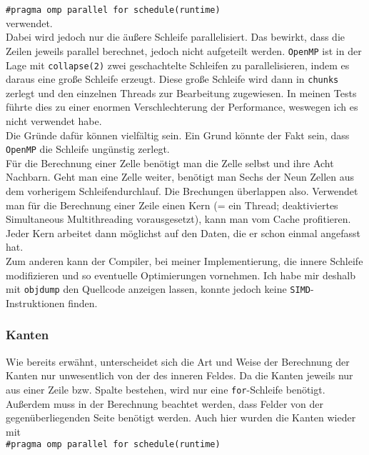 \documentclass[german,plainarticle,hyperref,utf8]{zihpub}
\begin{document}
	\texttt{\#pragma omp parallel for schedule(runtime)}\\
	
	verwendet.\\
	Dabei wird jedoch nur die äußere Schleife parallelisiert. Das bewirkt, dass die Zeilen jeweils parallel berechnet, jedoch nicht aufgeteilt werden. \texttt{OpenMP} ist in der Lage mit \texttt{collapse(2)} zwei geschachtelte Schleifen zu parallelisieren, indem es daraus eine große Schleife erzeugt. Diese große Schleife wird dann in \texttt{chunks} zerlegt und den einzelnen Threads zur Bearbeitung zugewiesen. In meinen Tests führte dies zu einer enormen Verschlechterung der Performance, weswegen ich es nicht verwendet habe.\\
	
	Die Gründe dafür können vielfältig sein. Ein Grund könnte der Fakt sein, dass \texttt{OpenMP} die Schleife ungünstig zerlegt.\\
	Für die Berechnung einer Zelle benötigt man die Zelle selbst und ihre Acht Nachbarn. Geht man eine Zelle weiter, benötigt man Sechs der Neun Zellen aus dem vorherigem Schleifendurchlauf. Die Brechungen überlappen also. Verwendet man für die Berechnung einer Zeile einen Kern (= ein Thread; deaktiviertes Simultaneous Multithreading vorausgesetzt), kann man vom Cache profitieren. Jeder Kern arbeitet dann möglichst auf den Daten, die er schon einmal angefasst hat.\\
	
	Zum anderen kann der Compiler, bei meiner Implementierung, die innere Schleife modifizieren und so eventuelle Optimierungen vornehmen. Ich habe mir deshalb mit \texttt{objdump} den Quellcode anzeigen lassen, konnte jedoch keine \texttt{SIMD}-Instruktionen finden.
	
	\subsubsection{Kanten}
	
	Wie bereits erwähnt, unterscheidet sich die Art und Weise der Berechnung der Kanten nur unwesentlich von der des inneren Feldes. Da die Kanten jeweils nur aus einer Zeile bzw. Spalte bestehen, wird nur eine \texttt{for}-Schleife benötigt. Außerdem muss in der Berechnung beachtet werden, dass Felder von der gegenüberliegenden Seite benötigt werden.
	Auch hier wurden die Kanten wieder mit\\
	
	\texttt{\#pragma omp parallel for schedule(runtime)}\\
	
\end{document}
